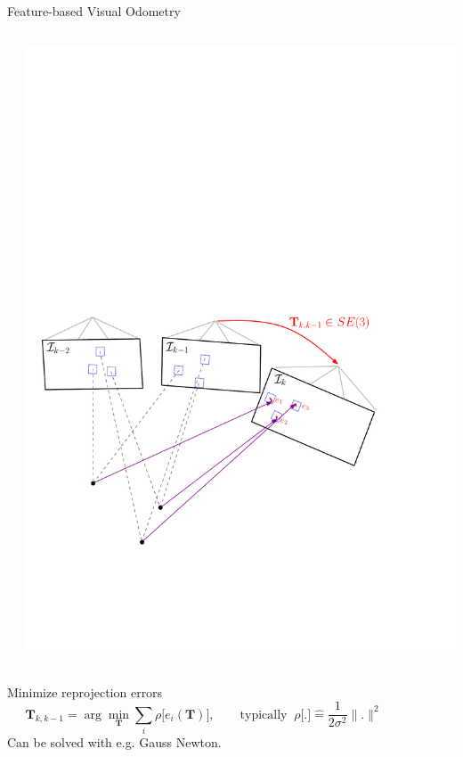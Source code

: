 \documentclass[10pt]{beamer}
\newcommand{\T}{\mathbf{T}}
\begin{document}
\begin{frame}{Feature-based Visual Odometry}
\begin{columns}
\begin{column}{0.4\textwidth}
	  \end{column}
	  \begin{column}{0.6\textwidth}
	    \includegraphics[width=\textwidth]{img/vo_pipeline_6}
	  \end{column}
	\end{columns}
	\begin{columns}
		\begin{column}{0.9\textwidth}
			\begin{block}{Minimize reprojection errors}
				\[
					\T_{k,k-1} = \arg\min_{\T} \sum_{i} \rho \big[ e_i(\T) \big], \qquad \text{typically } \ \rho\big[.\big] \hat{=} \frac{1}{2\sigma^2} \parallel.\parallel^2
				\]
				Can be solved with e.g. Gauss Newton.
			\end{block}
		\end{column}
		\begin{column}{0.1\textwidth}
		\end{column}
    \end{columns}
\end{frame}
\end{document}
